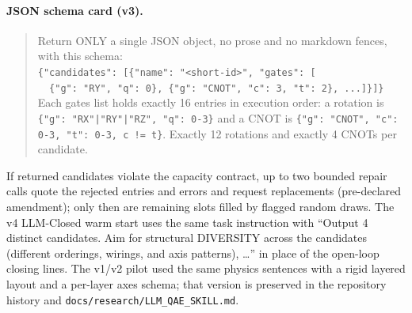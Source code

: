 \documentclass[11pt]{article}
\begin{document}
\paragraph{JSON schema card (v3).}
\begin{quote}\small
Return ONLY a single JSON object, no prose and no markdown fences, with this schema:\\
\texttt{\{"candidates": [\{"name": "<short-id>", "gates": [}\\
\texttt{\ \ \{"g": "RY", "q": 0\}, \{"g": "CNOT", "c": 3, "t": 2\}, ...]\}]\}}\\
Each gates list holds exactly 16 entries in execution order: a rotation is \texttt{\{"g": "RX"|"RY"|"RZ", "q": 0-3\}} and a CNOT is \texttt{\{"g": "CNOT", "c": 0-3, "t": 0-3, c != t\}}. Exactly 12 rotations and exactly 4 CNOTs per candidate.
\end{quote}
If returned candidates violate the capacity contract, up to two bounded repair calls quote the rejected entries and errors and request replacements (pre-declared amendment); only then are remaining slots filled by flagged random draws.
The v4 LLM-Closed warm start uses the same task instruction with ``Output 4 distinct candidates. Aim for structural DIVERSITY across the candidates (different orderings, wirings, and axis patterns), \ldots'' in place of the open-loop closing lines.
The v1/v2 pilot used the same physics sentences with a rigid layered layout and a per-layer axes schema; that version is preserved in the repository history and \texttt{docs/research/LLM\_QAE\_SKILL.md}.
\end{document}
